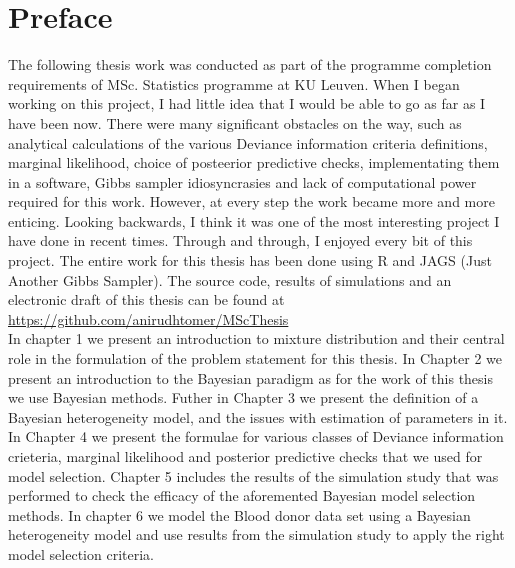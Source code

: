
\chapter{Preface}
\label{ch : preface}

The following thesis work was conducted as part of the programme completion requirements of MSc. Statistics programme at KU Leuven. When I began working on this project, I had little idea that I would be able to go as far as I have been now. There were many significant obstacles on the way, such as analytical calculations of the various Deviance information criteria definitions, marginal likelihood, choice of posteerior predictive checks, implementating them in a software, Gibbs sampler idiosyncrasies and lack of computational power required for this work. However, at every step the work became more and more enticing. Looking backwards, I think it was one of the most interesting project I have done in recent times. Through and through, I enjoyed every bit of this project. The entire work for this thesis has been done using R and JAGS (Just Another Gibbs Sampler). The source code, results of simulations and an electronic draft of this thesis can be found at\\
\url{https://github.com/anirudhtomer/MScThesis}\\

In chapter 1 we present an introduction to mixture distribution and their central role in the formulation of the problem statement for this thesis. In Chapter 2 we present an introduction to the Bayesian paradigm as for the work of this thesis we use Bayesian methods. Futher in Chapter 3 we present the definition of a Bayesian heterogeneity model, and the issues with estimation of parameters in it. In Chapter 4 we present the formulae for various classes of Deviance information crieteria, marginal likelihood and posterior predictive checks that we used for model selection. Chapter 5 includes the results of the simulation study that was performed to check the efficacy of the aforemented Bayesian model selection methods. In chapter 6 we model the Blood donor data set \citep{nasserinejad_prevalence_2015} using a Bayesian heterogeneity model and use results from the simulation study to apply the right model selection criteria.\\

